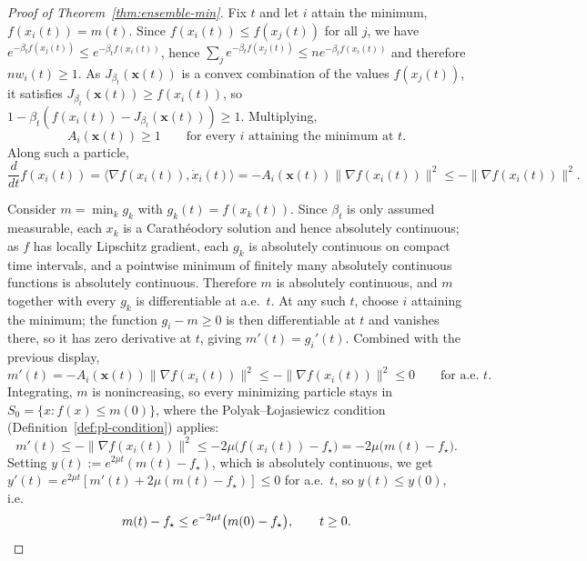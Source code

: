 \documentclass{article} %
\theoremstyle{plain}
\theoremstyle{definition}
\theoremstyle{remark}
\newcommand{\prefactor}[2]{A_{#1}(#2)}
\newcommand{\xx}{\mathbf{x}}
\begin{document}
\begin{proof}[Proof of Theorem~\ref{thm:ensemble-min}]
    Fix $t$ and let $i$ attain the minimum, $f(x_i(t))=m(t)$. Since $f(x_i(t))\le f(x_j(t))$ for all $j$, we have $e^{-\beta_tf(x_j(t))}\le e^{-\beta_tf(x_i(t))}$, hence $\sum_je^{-\beta_tf(x_j(t))}\le ne^{-\beta_tf(x_i(t))}$ and therefore $nw_i(t)\ge1$. As $J_{\beta_t}(\xx(t))$ is a convex combination of the values $f(x_j(t))$, it satisfies $J_{\beta_t}(\xx(t))\ge f(x_i(t))$, so $1-\beta_t(f(x_i(t))-J_{\beta_t}(\xx(t)))\ge1$. Multiplying,
    \begin{equation}
        \prefactor{i}{\xx(t)}\ge1 \qquad \text{for every } i \text{ attaining the minimum at } t.
        \label{eq:ai-ge-1}
    \end{equation}
    Along such a particle,
    \[
        \frac{d}{dt}f(x_i(t)) = \langle\nabla f(x_i(t)),\dot x_i(t)\rangle = -\prefactor{i}{\xx(t)}\|\nabla f(x_i(t))\|^2 \le -\|\nabla f(x_i(t))\|^2.
    \]

    Consider $m=\min_k g_k$ with $g_k(t)=f(x_k(t))$. Since $\beta_t$ is only assumed measurable, each $x_k$ is a Carath\'eodory solution and hence absolutely continuous; as $f$ has locally Lipschitz gradient, each $g_k$ is absolutely continuous on compact time intervals, and a pointwise minimum of finitely many absolutely continuous functions is absolutely continuous. Therefore $m$ is absolutely continuous, and $m$ together with every $g_k$ is differentiable at a.e.\ $t$. At any such $t$, choose $i$ attaining the minimum; the function $g_i-m\ge0$ is then differentiable at $t$ and vanishes there, so it has zero derivative at $t$, giving $m'(t)=g_i'(t)$. Combined with the previous display,
    \[
        m'(t)=-\prefactor{i}{\xx(t)}\|\nabla f(x_i(t))\|^2\le-\|\nabla f(x_i(t))\|^2\le0 \qquad \text{for a.e. } t.
    \]
    Integrating, $m$ is nonincreasing, so every minimizing particle stays in $S_0=\{x:f(x)\le m(0)\}$, where the Polyak--\L{}ojasiewicz condition (Definition~\ref{def:pl-condition}) applies:
    \[
        m'(t)\le-\|\nabla f(x_i(t))\|^2\le-2\mu\bigl(f(x_i(t))-f_\star\bigr)=-2\mu\bigl(m(t)-f_\star\bigr).
    \]
    Setting $y(t):=e^{2\mu t}(m(t)-f_\star)$, which is absolutely continuous, we get $y'(t)=e^{2\mu t}[m'(t)+2\mu(m(t)-f_\star)]\le0$ for a.e.\ $t$, so $y(t)\le y(0)$, i.e.
    \[
        m(t)-f_\star\le e^{-2\mu t}\bigl(m(0)-f_\star\bigr), \qquad t\ge0. \qedhere
    \]
\end{proof}
\end{document}
